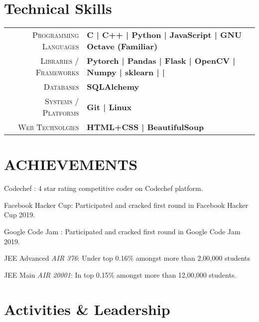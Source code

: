 \documentclass[]{deedy-resume-openfont}
\begin{document}
\begin{minipage}[t]{0.66\textwidth}
\section{Technical Skills}
\begin{tabular}{r|p{15cm}}
\textsc{Programming Languages} & \textbf{ C | C++ | Python | JavaScript | GNU Octave (Familiar)} \\
\textsc{Libraries / Frameworks} & \textbf{Pytorch | Pandas | Flask | OpenCV | Numpy | sklearn |  |  }\\
\textsc{Databases} & \textbf{SQLAlchemy}\\
\textsc{Systems / Platforms} & \textbf{Git | Linux}\\ 
\textsc{Web Technolgies} & \textbf{HTML+CSS	| BeautifulSoup} \\
\end{tabular}

\section{ACHIEVEMENTS}

\vspace{\topsep} %
\begin{tightemize}

\item{Codechef :} 4 star rating competitive coder on Codechef platform.
\item{Facebook Hacker Cup:} Participated and cracked first round in Facebook Hacker Cup 2019.
\item{Google Code Jam :} Participated and cracked first round in Google Code Jam 2019.
\item{JEE Advanced \emph{AIR 376}:} Under top 0.16\% amongst more than 2,00,000 students \\
\item {JEE Main \emph{AIR 20001}:} In top 0.15\% amongst more than 12,00,000 students. \\
\end{tightemize}
\sectionsep


\section{Activities \& Leadership}


\end{minipage}
\end{document}
